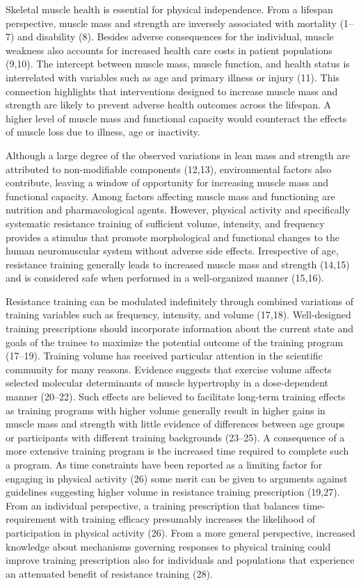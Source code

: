 \documentclass[twoside,10pt]{gihclass} %
\begin{document}
Skeletal muscle health is essential for physical independence. From a lifespan perspective, muscle mass and strength are inversely associated with mortality
(1--7)
and disability
(8).
Besides adverse consequences for the individual, muscle weakness also accounts for increased health care costs in patient populations
(9,10).
The intercept between muscle mass, muscle function, and health status is interrelated with variables such as age and primary illness or injury
(11).
This connection highlights that interventions designed to increase muscle mass and strength are likely to prevent adverse health outcomes across the lifespan. A higher level of muscle mass and functional capacity would counteract the effects of muscle loss due to illness, age or inactivity.

Although a large degree of the observed variations in lean mass and strength are attributed to non-modifiable components
(12,13),
environmental factors also contribute, leaving a window of opportunity for increasing muscle mass and functional capacity. Among factors affecting muscle mass and functioning are nutrition and pharmacological agents. However, physical activity and specifically systematic resistance training of sufficient volume, intensity, and frequency provides a stimulus that promote morphological and functional changes to the human neuromuscular system without adverse side effects. Irrespective of age, resistance training generally leads to increased muscle mass and strength
(14,15)
and is considered safe when performed in a well-organized manner
(15,16).

Resistance training can be modulated indefinitely through combined variations of training variables such as frequency, intensity, and volume
(17,18).
Well-designed training prescriptions should incorporate information about the current state and goals of the trainee to maximize the potential outcome of the training program
(17--19).
Training volume has received particular attention in the scientific community for many reasons. Evidence suggests that exercise volume affects selected molecular determinants of muscle hypertrophy in a dose-dependent manner
(20--22).
Such effects are believed to facilitate long-term training effects as training programs with higher volume generally result in higher gains in muscle mass and strength with little evidence of differences between age groups or participants with different training backgrounds
(23--25).
A consequence of a more extensive training program is the increased time required to complete such a program. As time constraints have been reported as a limiting factor for engaging in physical activity
(26)
some merit can be given to arguments against guidelines suggesting higher volume in resistance training prescription
(19,27).
From an individual perspective, a training prescription that balances time-requirement with training efficacy presumably increases the likelihood of participation in physical activity
(26).
From a more general perspective, increased knowledge about mechanisms governing responses to physical training could improve training prescription also for individuals and populations that experience an attenuated benefit of resistance training
(28).
\end{document}
